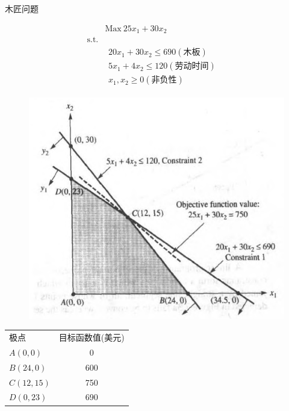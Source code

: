 \documentclass[mathserif, table]{beamer}
\begin{document}
\begin{frame}{木匠问题}
  \begin{figure}
    \begin{minipage}{.5\linewidth}
      \[ 
      \begin{array}{lcl}
        & \mbox{Max}\ 25x_1 + 30x_2 & \\
        \mbox{s.t.} & &  \\
        &
        \begin{array}{c}
          20x_1 + 30x_2 \le 690 (\text{木板})\\
          5x_1 + 4x_2 \le 120 (\text{劳动时间})\\
          x_1, x_2 \ge 0 (\text{非负性})
        \end{array}
        &
      \end{array}
      \]
    \end{minipage}%
    \begin{minipage}{.5\linewidth}
      \includegraphics[width=\textwidth{}]{wood.png}    
    \end{minipage}
  \end{figure}
  \begin{table}
    \centering
    \begin{tabular}{lc}
      极点 & 目标函数值(美元)\\[-5pt]
      $A(0, 0)$ & 0 \\[-5pt]
      $B(24, 0)$ & 600 \\[-5pt]
      $C(12, 15)$ & 750 \\[-5pt]
      $D(0, 23)$ & 690
    \end{tabular}
  \end{table}
  
\end{frame}
\end{document}
